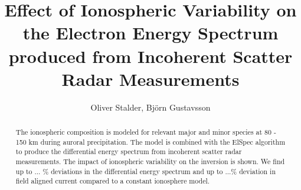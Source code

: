 \documentclass[10pt, a4paper]{article}
\numberwithin{equation}{section}										%
\begin{document}
%
\title{Effect of Ionospheric Variability on the Electron Energy Spectrum produced from Incoherent Scatter Radar Measurements}
\author{Oliver Stalder, Björn Gustavsson}
\maketitle

\begin{abstract}
The ionospheric composition is modeled for relevant major and minor species at 80 - 150 km during auroral precipitation. The model is combined with the ElSpec algorithm \cite{virtanen_electron_2018} to produce the differential energy spectrum from incoherent scatter radar measurements. The impact of ionospheric variability on the inversion is shown. We find up to ... \% deviations in the differential energy spectrum and up to ...\% deviation in field aligned current compared to a constant ionosphere model.
\end{abstract}





%
%	
%



\end{document}
